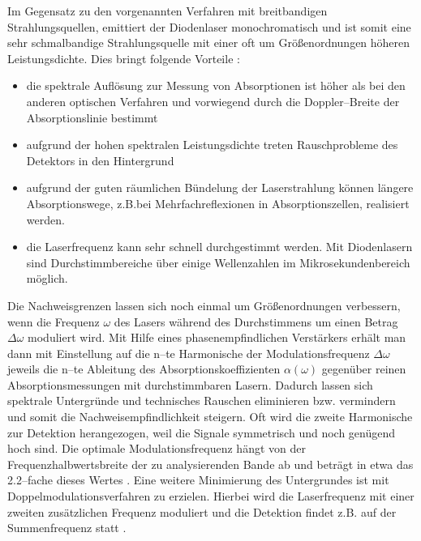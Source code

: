 Im Gegensatz zu den vorgenannten Verfahren mit breitbandigen
Strahlungsquellen, emittiert der Diodenlaser monochromatisch und
ist somit eine sehr schmalbandige Strahlungsquelle mit einer oft
um Grö{\ss}enordnungen höheren Leistungsdichte. Dies bringt folgende
Vorteile \cite{demtröder93}:
\begin{itemize}
  \item die spektrale Auflösung zur Messung von Absorptionen ist höher
  als bei den anderen optischen Verfahren und vorwiegend durch die
  Doppler--Breite der Absorptionslinie bestimmt
  \item aufgrund der hohen spektralen Leistungsdichte treten
  Rauschprobleme des Detektors in den Hintergrund
  \item aufgrund der guten räumlichen Bündelung der Laserstrahlung
  können längere Absorptionswege, z.B.bei Mehrfachreflexionen in
  Absorptionszellen, realisiert werden.
  \item die Laserfrequenz kann sehr schnell durchgestimmt werden.
  Mit Diodenlasern sind Durchstimmbereiche über einige
  Wellenzahlen im Mikrosekundenbereich möglich.
\end{itemize}

Die Nachweisgrenzen lassen sich noch einmal um Grö{\ss}enordnungen
verbessern, wenn die Frequenz $\omega$ des Lasers während des
Durchstimmens um einen Betrag $\Delta\omega$ moduliert wird. Mit
Hilfe eines phasenempfindlichen Verstärkers erhält man dann mit
Einstellung auf die n--te Harmonische der Modulationsfrequenz
$\Delta\omega$ jeweils die n--te Ableitung des
Absorptionskoeffizienten $\alpha(\omega)$ gegenüber reinen
Absorptionsmessungen mit durchstimmbaren Lasern. Dadurch lassen
sich spektrale Untergründe und technisches Rauschen eliminieren
bzw. vermindern und somit die Nachweisempfindlichkeit steigern.
Oft wird die zweite Harmonische zur Detektion herangezogen, weil
die Signale symmetrisch und noch genügend hoch sind. Die optimale
Modulationsfrequenz hängt von der Frequenzhalbwertsbreite der zu
analysierenden Bande ab und beträgt in etwa das 2.2--fache dieses
Wertes \cite{silver92}. Eine weitere Minimierung des Untergrundes
ist mit Doppelmodulationsverfahren zu erzielen. Hierbei wird die
Laserfrequenz mit einer zweiten zusätzlichen Frequenz moduliert
und die Detektion findet z.B. auf der Summenfrequenz statt
\cite{zybin95}.\\

